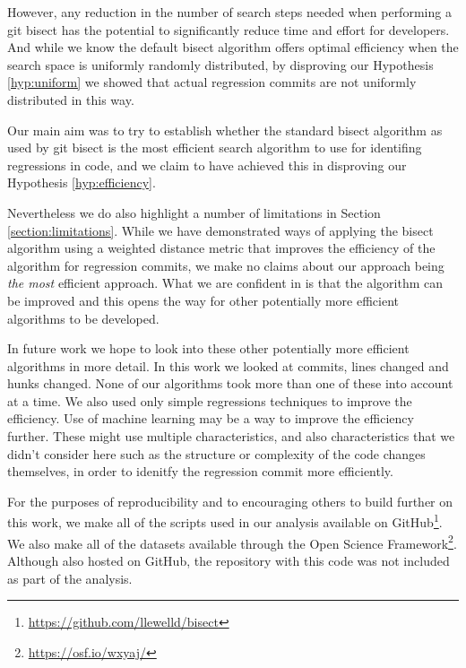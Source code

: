 \documentclass[10pt,journal,compsoc]{IEEEtran}
\begin{document}
However, any reduction in the number of search steps needed when performing a {\code git bisect} has the potential to significantly reduce time and effort for developers. And while we know the default bisect algorithm offers optimal efficiency when the search space is uniformly randomly distributed, by disproving our Hypothesis \ref{hyp:uniform} we showed that actual regression commits are not uniformly distributed in this way.

Our main aim was to try to establish whether the standard bisect algorithm as used by {\code git bisect} is the most efficient search algorithm to use for identifing regressions in code, and we claim to have achieved this in disproving our Hypothesis \ref{hyp:efficiency}.

Nevertheless we do also highlight a number of limitations in Section \ref{section:limitations}. While we have demonstrated ways of applying the bisect algorithm using a weighted distance metric that improves the efficiency of the algorithm for regression commits, we make no claims about our approach being {\it the most\/} efficient approach. What we are confident in is that the algorithm can be improved and this opens the way for other potentially more efficient algorithms to be developed.

In future work we hope to look into these other potentially more efficient algorithms in more detail. In this work we looked at commits, lines changed and hunks changed. None of our algorithms took more than one of these into account at a time. We also used only simple regressions techniques to improve the efficiency. Use of machine learning may be a way to improve the efficiency further. These might use multiple characteristics, and also characteristics that we didn't consider here such as the structure or complexity of the code changes themselves, in order to idenitfy the regression commit more efficiently.

For the purposes of reproducibility and to encouraging others to build further on this work, we make all of the scripts used in our analysis available on GitHub\footnote{\url{https://github.com/llewelld/bisect}}. We also make all of the datasets available through the Open Science Framework\footnote{\url{https://osf.io/wxyaj/}}. Although also hosted on GitHub, the repository with this code was not included as part of the analysis.
\end{document}
